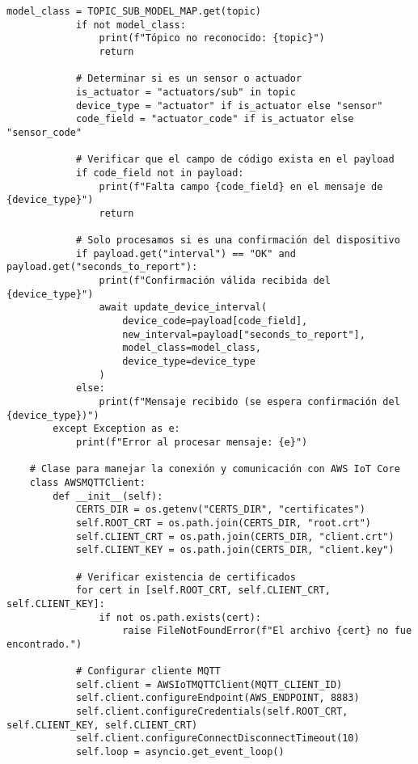 \begin{lstlisting}[label=cod:mqtt_connection,caption=Definición de Clase para cliente MQTT., language=PythonUTF8]
            model_class = TOPIC_SUB_MODEL_MAP.get(topic)
            if not model_class:
                print(f"Tópico no reconocido: {topic}")
                return

            # Determinar si es un sensor o actuador
            is_actuator = "actuators/sub" in topic
            device_type = "actuator" if is_actuator else "sensor"
            code_field = "actuator_code" if is_actuator else "sensor_code"
            
            # Verificar que el campo de código exista en el payload
            if code_field not in payload:
                print(f"Falta campo {code_field} en el mensaje de {device_type}")
                return

            # Solo procesamos si es una confirmación del dispositivo
            if payload.get("interval") == "OK" and payload.get("seconds_to_report"):
                print(f"Confirmación válida recibida del {device_type}")
                await update_device_interval(
                    device_code=payload[code_field],
                    new_interval=payload["seconds_to_report"],
                    model_class=model_class,
                    device_type=device_type
                )
            else:
                print(f"Mensaje recibido (se espera confirmación del {device_type})")
        except Exception as e:
            print(f"Error al procesar mensaje: {e}")
                
    # Clase para manejar la conexión y comunicación con AWS IoT Core
    class AWSMQTTClient:
        def __init__(self):
            CERTS_DIR = os.getenv("CERTS_DIR", "certificates")
            self.ROOT_CRT = os.path.join(CERTS_DIR, "root.crt")
            self.CLIENT_CRT = os.path.join(CERTS_DIR, "client.crt")
            self.CLIENT_KEY = os.path.join(CERTS_DIR, "client.key")

            # Verificar existencia de certificados
            for cert in [self.ROOT_CRT, self.CLIENT_CRT, self.CLIENT_KEY]:
                if not os.path.exists(cert):
                    raise FileNotFoundError(f"El archivo {cert} no fue encontrado.")

            # Configurar cliente MQTT
            self.client = AWSIoTMQTTClient(MQTT_CLIENT_ID)
            self.client.configureEndpoint(AWS_ENDPOINT, 8883)
            self.client.configureCredentials(self.ROOT_CRT, self.CLIENT_KEY, self.CLIENT_CRT)
            self.client.configureConnectDisconnectTimeout(10)
            self.loop = asyncio.get_event_loop()


\end{lstlisting}
